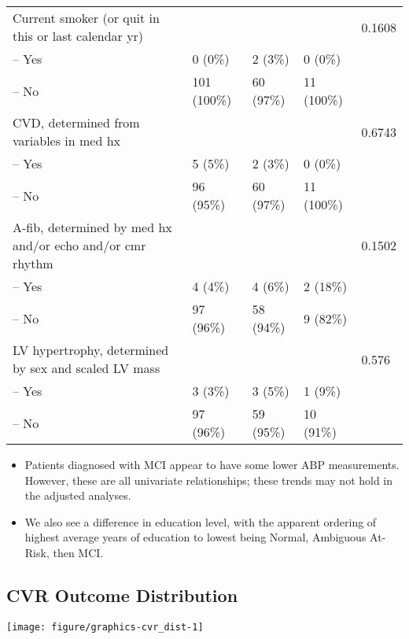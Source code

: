 \documentclass[10pt]{article}\usepackage[]{graphicx}\usepackage[]{color}
\makeatletter
\def\maxwidth{ %
  \ifdim\Gin@nat@width>\linewidth
    \linewidth
  \else
    \Gin@nat@width
  \fi
}
\newenvironment{knitrout}{}{} %
\makeatother
\begin{document}
\begin{table}[ht]
\begin{tabular}{lllll}
  Current smoker (or quit in this or last calendar yr) &  &  &  & 0.1608 \\ 
  -- Yes & 0 (0\%) & 2 (3\%) & 0 (0\%) &  \\ 
  -- No & 101 (100\%) & 60 (97\%) & 11 (100\%) &  \\ 
  CVD, determined from variables in med hx &  &  &  & 0.6743 \\ 
  -- Yes & 5 (5\%) & 2 (3\%) & 0 (0\%) &  \\ 
  -- No & 96 (95\%) & 60 (97\%) & 11 (100\%) &  \\ 
  A-fib, determined by med hx and/or echo and/or cmr rhythm &  &  &  & 0.1502 \\ 
  -- Yes & 4 (4\%) & 4 (6\%) & 2 (18\%) &  \\ 
  -- No & 97 (96\%) & 58 (94\%) & 9 (82\%) &  \\ 
  LV hypertrophy, determined by sex and scaled LV mass &  &  &  & 0.576 \\ 
  -- Yes & 3 (3\%) & 3 (5\%) & 1 (9\%) &  \\ 
  -- No & 97 (96\%) & 59 (95\%) & 10 (91\%) &  \\ 
   \bottomrule
\end{tabular}
\end{table}




\begin{itemize}
  \item Patients diagnosed with MCI appear to have some lower ABP measurements. However, these are all univariate relationships; these trends may not hold in the adjusted analyses.
  \item We also see a difference in education level, with the apparent ordering of highest average years of education to lowest being Normal, Ambiguous At-Risk, then MCI.
\end{itemize}

\clearpage
\subsection{CVR Outcome Distribution}

\begin{knitrout}
\color{fgcolor}

{\centering \texttt{[image: figure/graphics-cvr\_dist-1]} 

}



\end{knitrout}
\end{document}
